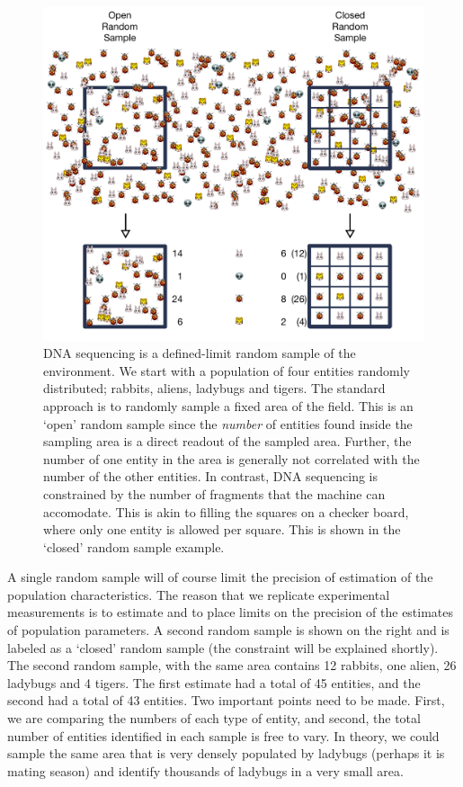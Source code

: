 \documentclass[onecolumn]{article}
\begin{document}
\begin{figure}
\centering
\includegraphics{figs/RALT.pdf}
\caption{\label{RALT} DNA sequencing is a defined-limit random sample of the environment. We start with a population of four entities randomly distributed; rabbits, aliens, ladybugs and tigers. The standard approach is to randomly sample a fixed area of the field. This is an `open' random sample since the \emph{number} of entities found inside the sampling area is a direct readout of the sampled area. Further, the number of one entity in the area is generally not correlated with the number of the other entities. In contrast, DNA sequencing is constrained by the number of fragments that the machine can accomodate. This is akin to filling the squares on a checker board, where only one entity is allowed per square. This is shown in the `closed' random sample example.}
\end{figure}

A single random sample will of course limit the precision of estimation of the population characteristics. The reason that we replicate experimental measurements is to estimate and to place limits on the precision of the estimates of population parameters. A second random sample is shown on the right and is labeled as a `closed' random sample (the constraint will be explained shortly). The second random sample, with the same area contains 12 rabbits, one alien, 26 ladybugs and 4 tigers. The first estimate had a total of 45 entities, and the second had a total of 43 entities. Two important points need to be made. First, we are comparing the numbers of each type of entity, and second, the total number of entities identified in each sample is free to vary. In theory, we could sample the same area that is very densely populated by ladybugs (perhaps it is mating season) and identify thousands of ladybugs in a very small area.
\end{document}
